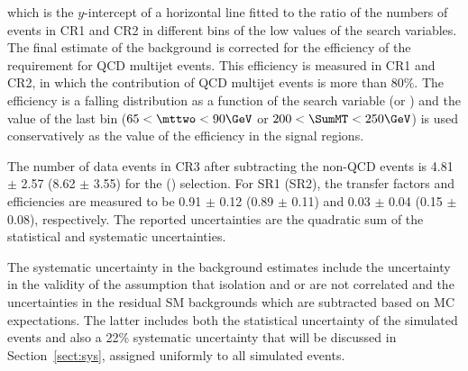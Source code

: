 which is the $y$-intercept of a horizontal line fitted to the ratio of the numbers of events in CR1 and CR2 in different bins of the low values of the search variables.
The final estimate of the background 
is corrected for the efficiency of 
the \deltaphi requirement for QCD multijet events. This efficiency is measured in CR1 and CR2, 
in which the contribution of QCD multijet events is more than $80\%$. The efficiency is a falling distribution as a function of 
the search variable (\mttwo or \SumMT)
and the value of the last bin ($65<\mttwo<90\GeV$ or $200<\SumMT<250\GeV$) is used conservatively as the 
value of the efficiency in the signal regions.

The number of data events in CR3 after subtracting the non-QCD events is 4.81 $\pm$ 2.57 (8.62 $\pm$ 3.55) for the \binone (\bintwo) selection.
For SR1 (SR2), the transfer factors and  \deltaphi efficiencies are measured to be 0.91 $\pm$ 0.12 (0.89 $\pm$ 0.11) and 0.03 $\pm$ 0.04 (0.15 $\pm$ 0.08), 
respectively.
The reported uncertainties are the quadratic sum of the statistical and systematic uncertainties.


The systematic uncertainty in the background estimates include the uncertainty in the validity of the assumption that isolation and \mttwo or \SumMT are not correlated and the uncertainties in the residual 
SM backgrounds which  are subtracted based on MC expectations. 
The latter includes both the statistical uncertainty of the simulated 
events and also a 22\% systematic uncertainty that will be discussed in Section~\ref{sect:sys}, 
assigned uniformly to all simulated events.

